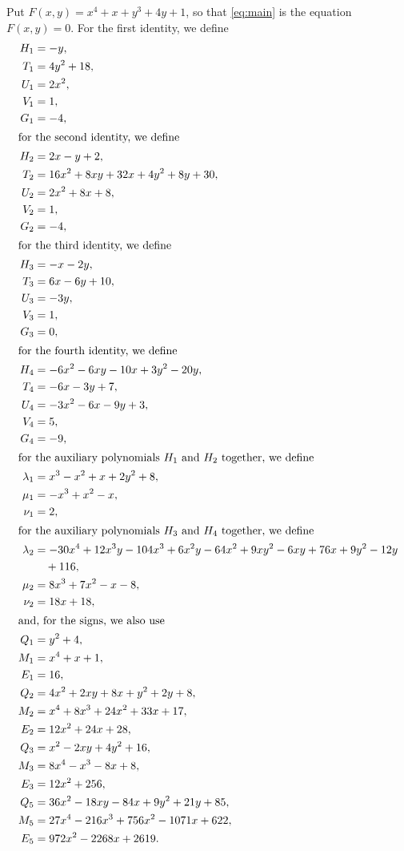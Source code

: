 \documentclass[11pt]{article}
\begin{document}
Put $F(x,y)=x^{4}+x+y^{3}+4y+1$, so that \eqref{eq:main} is the equation $F(x,y)=0$. For the first identity, we define
\begin{align*}
H_{1}&=-y,\\
T_{1}&=4y^{2}+18,\\
U_{1}&=2x^{2},\\
V_{1}&=1,\\
G_{1}&=-4,\\
\intertext{for the second identity, we define}
H_{2}&=2x-y+2,\\
T_{2}&=16x^{2}+8xy+32x+4y^{2}+8y+30,\\
U_{2}&=2x^{2}+8x+8,\\
V_{2}&=1,\\
G_{2}&=-4,\\
\intertext{for the third identity, we define}
H_{3}&=-x-2y,\\
T_{3}&=6x-6y+10,\\
U_{3}&=-3y,\\
V_{3}&=1,\\
G_{3}&=0,\\
\intertext{for the fourth identity, we define}
H_{4}&=-6x^{2}-6xy-10x+3y^{2}-20y,\\
T_{4}&=-6x-3y+7,\\
U_{4}&=-3x^{2}-6x-9y+3,\\
V_{4}&=5,\\
G_{4}&=-9,\\
\intertext{for the auxiliary polynomials $H_{1}$ and $H_{2}$ together, we define}
\lambda_{1}&=x^{3}-x^{2}+x+2y^{2}+8,\\
\mu_{1}&=-x^{3}+x^{2}-x,\\
\nu_{1}&=2,\\
\intertext{for the auxiliary polynomials $H_{3}$ and $H_{4}$ together, we define}
\lambda_{2}&=-30x^{4}+12x^{3}y-104x^{3}+6x^{2}y-64x^{2}+9xy^{2}-6xy+76x+9y^{2}-12y\\
&\quad+116,\\
\mu_{2}&=8x^{3}+7x^{2}-x-8,\\
\nu_{2}&=18x+18,\\
\intertext{and, for the signs, we also use}
Q_{1}&=y^{2}+4,\\
M_{1}&=x^{4}+x+1,\\
E_{1}&=16,\\
Q_{2}&=4x^{2}+2xy+8x+y^{2}+2y+8,\\
M_{2}&=x^{4}+8x^{3}+24x^{2}+33x+17,\\
E_{2}&=12x^{2}+24x+28,\\
Q_{3}&=x^{2}-2xy+4y^{2}+16,\\
M_{3}&=8x^{4}-x^{3}-8x+8,\\
E_{3}&=12x^{2}+256,\\
Q_{5}&=36x^{2}-18xy-84x+9y^{2}+21y+85,\\
M_{5}&=27x^{4}-216x^{3}+756x^{2}-1071x+622,\\
E_{5}&=972x^{2}-2268x+2619.
\end{align*}
\end{document}
